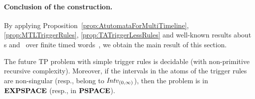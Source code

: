 \paragraph{Conclusion of the construction.}
By applying Proposition~\ref{prop:AtutomataForMultiTimeline}, \ref{prop:MTLTriggerRules}, \ref{prop:TATriggerLessRules} and well-known results about \TA s and \MTL\ over finite timed words~\cite{ALUR1994183,OuaknineW07},
we obtain the main result of this section.

\begin{theorem}\label{theorem:UpperBounds}
The future TP problem with simple trigger rules is decidable (with non-primitive recursive complexity).
Moreover, if the intervals in the atoms of the trigger rules are non-singular
(resp., belong to ${\mathit{Intv}}_{(0,\infty)}$), then the problem is in $\textbf{EXPSPACE}$ (resp., in $\textbf{PSPACE}$).
\end{theorem}
